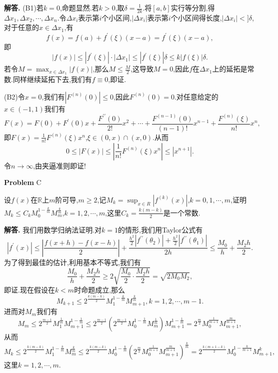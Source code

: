 \documentclass{article}
\newcounter{problemname}
\newenvironment{problem}{\begin{shaded}\stepcounter{problemname}\par\noindent\textbf{Problem }}{\end{shaded}\par}
\newenvironment{solution}{\par\noindent\textbf{解答. }}{\par}
\begin{document}
\begin{solution}
(B1)若$k=0$,命题显然.若$k>0$,取$\delta=\frac{1}{2k}$.将$[a,b]$实行等分割,得$\Delta x_1,\Delta x_2,\cdots,\Delta x_n$.令$\Delta x_i$表示第$i$个小区间,$|\Delta x_i|$表示第$i$个小区间得长度,$|\Delta x_i|<]\delta$,对于任意的$x\in\Delta x_1$,有
$$f(x)=f(a)+f^\prime(\xi)(x-a)=f^\prime(\xi)(x-a),$$
即
$$|f(x)|\le|f^\prime(\xi)|\cdot|\Delta x_1|\le|f^\prime(\xi)|\delta\le k|f(\xi)|\delta.$$
若令$M=\max_{x\in\Delta x_1}|f(x)|$,那么$M\le\frac{M}{2}$,这导致$M=0$,因此$f$在$\Delta x_1$上的延拓是常数.同样继续延拓下去,我们有$f\equiv 0$,即证.\par
(B2)令$x=0$,我们有$|F^{(n)}(0)|\le 0$,因此$F^{(n)}(0)=0$.对任意给定的$x\in(-1,1)$我们有
$$
F\left( x \right) =F\left( 0 \right) +F^{\prime}\left( 0 \right) x+\frac{F^{\prime\prime}\left( 0 \right)}{2!}x^2+\cdots +\frac{F^{\left( n-1 \right)}\left( 0 \right)}{\left( n-1 \right) !}x^{n-1}+\frac{F^{\left( n \right)}\left( \xi \right)}{n!}x^n,
$$
即$F(x)=\frac{1}{n!}F^{(n)}(\xi)x^n$,$\xi\in(0,x)\cap(x,0)$.从而
$$
0\le \left| F\left( x \right) \right|\le \left| \frac{1}{n!}F^{\left( n \right)}\left( \xi \right) x^n \right|\le \left| x^{n+1} \right|.
$$
令$n\to\infty$,由夹逼准则即证!
\end{solution}
\begin{problem}{C}\par
设$f(x)$在$\mathbb{R}$上$m$阶可导,$m\ge 2$,记$M_k=\sup_{x\in R}|f^{(k)}(x)|$,$k=0,1,\cdots,m$,证明$M_k\le C_kM_0^{1-\frac{k}{m}}M_m^{\frac{k}{m}}$,$k=1,2,\cdots,m$,这里$C_k=\frac{k(m-k)}{2}$是一个常数.
\end{problem}
\begin{solution}
我们用数学归纳法证明.对$k=1$的情形,我们用Taylor公式有
$$
\left| f^{\prime}\left( x \right) \right|\le \left| \frac{f\left( x+h \right) -f\left( x-h \right)}{2} \right|+\frac{\frac{h^2}{2}\left| f^{\prime\prime}\left( \theta _2 \right) \right|+\frac{h^2}{2}\left| f^{\prime\prime}\left( \theta _1 \right) \right|}{2h}\le \frac{M_0}{h}+\frac{M_2h}{2}.
$$
为了得到最佳的估计,利用基本不等式,我们有
$$
\frac{M_0}{h}+\frac{M_2h}{2}\ge 2\sqrt{\frac{M_0}{2}\cdot \frac{M_2h}{2}}=\sqrt{2M_0M_2},
$$
即证.现在假设在$k<m$时命题成立,那么
$$
M_{k+1}\le 2^{\frac{k\left( m-k \right)}{2}}M_{1}^{1-\frac{k}{m}}M_{m+1}^{\frac{k}{m}},k=1,2,\cdots ,m-1.
$$
进而对$M_m$我们有
$$
M_m\le 2^{\frac{m-1}{2}}M_{1}^{\frac{1}{m}}M_{m+1}^{1-\frac{1}{m}}\le 2^{\frac{m-1}{2}}\left( 2^{\frac{m-1}{2}}M_{0}^{1-\frac{1}{m}}M_{m}^{\frac{1}{m}} \right) M_{m+1}^{1-\frac{1}{m}}=2^{\frac{m}{2}}M_{0}^{\frac{1}{m+1}}M_{m+1}^{\frac{m}{m+1}},
$$
从而
$$
M_k\le 2^{\frac{k\left( m-k \right)}{2}}M_{1}^{1-\frac{k}{m}}M_{m}^{\frac{k}{m}}\le 2^{\frac{k\left( m-k \right)}{2}}M_{0}^{1-\frac{k}{m}}\left( 2^{\frac{m}{2}}M_{0}^{\frac{1}{m+1}}M_{m+1}^{\frac{m}{m+1}} \right) ^{\frac{k}{m}}=2^{\frac{k\left( m+1-k \right)}{2}}M_{0}^{1-\frac{k}{m+1}}M_{m+1}^{k},
$$
这里$k=1,2,\cdots,m$.
\end{solution}
\newpage
\end{document}
